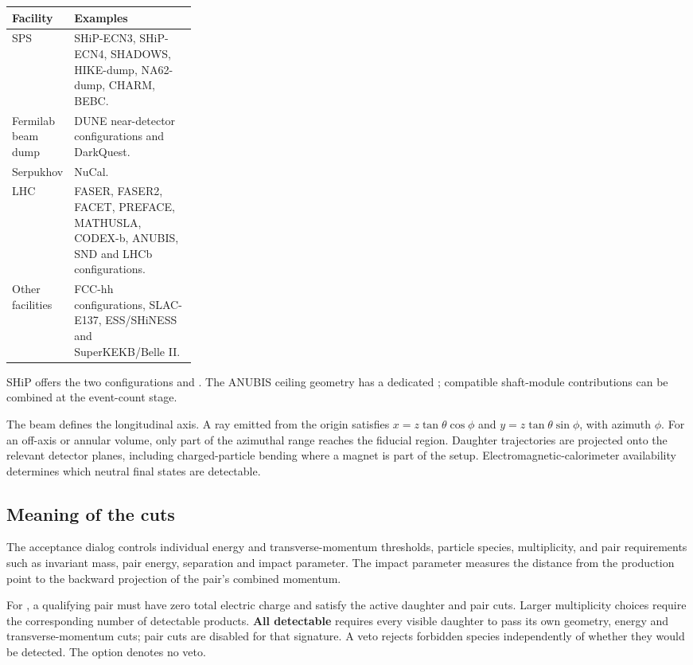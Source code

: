 \begin{tabularx}{\linewidth}{@{}P{0.27\linewidth}Y@{}}
\toprule
Facility & Examples \\
\midrule
SPS & SHiP-ECN3, SHiP-ECN4, SHADOWS, HIKE-dump, NA62-dump, CHARM, BEBC. \\
Fermilab beam dump & DUNE near-detector configurations and DarkQuest. \\
Serpukhov & NuCal. \\
LHC & FASER, FASER2, FACET, PREFACE, MATHUSLA, CODEX-b, ANUBIS, SND and LHCb configurations. \\
Other facilities & FCC-hh configurations, SLAC-E137, ESS/SHiNESS and SuperKEKB/Belle II. \\
\bottomrule
\end{tabularx}

SHiP offers the two configurations  and . The ANUBIS ceiling geometry has a dedicated ; compatible shaft-module contributions can be combined at the event-count stage.

The beam defines the longitudinal axis. A ray emitted from the origin satisfies $x=z\tan\theta\cos\phi$ and $y=z\tan\theta\sin\phi$, with azimuth $\phi$. For an off-axis or annular volume, only part of the azimuthal range reaches the fiducial region. Daughter trajectories are projected onto the relevant detector planes, including charged-particle bending where a magnet is part of the setup. Electromagnetic-calorimeter availability determines which neutral final states are detectable.

\subsection{Meaning of the cuts}
The acceptance dialog controls individual energy and transverse-momentum thresholds, particle species, multiplicity, and pair requirements such as invariant mass, pair energy, separation and impact parameter. The impact parameter measures the distance from the production point to the backward projection of the pair's combined momentum.

For \textbf{}, a qualifying pair must have zero total electric charge and satisfy the active daughter and pair cuts. Larger multiplicity choices require the corresponding number of detectable products. \textbf{All detectable} requires every visible daughter to pass its own geometry, energy and transverse-momentum cuts; pair cuts are disabled for that signature. A veto rejects forbidden species independently of whether they would be detected. The  option denotes no veto.

